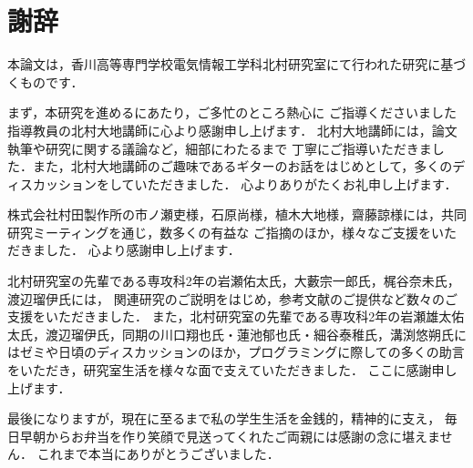 \chapter{謝辞}

本論文は，香川高等専門学校電気情報工学科北村研究室にて行われた研究に基づくものです．

まず，本研究を進めるにあたり，ご多忙のところ熱心に
ご指導くださいました指導教員の北村大地講師に心より感謝申し上げます．
北村大地講師には，論文執筆や研究に関する議論など，細部にわたるまで
丁寧にご指導いただきました．また，北村大地講師のご趣味であるギターのお話をはじめとして，多くのディスカッションをしていただきました．
心よりありがたくお礼申し上げます．

株式会社村田製作所の市ノ瀬吏様，石原尚様，植木大地様，齋藤諒様には，共同研究ミーティングを通じ，数多くの有益な
ご指摘のほか，様々なご支援をいただきました．
心より感謝申し上げます．

北村研究室の先輩である専攻科2年の岩瀬佑太氏，大藪宗一郎氏，梶谷奈未氏，渡辺瑠伊氏には，
関連研究のご説明をはじめ，参考文献のご提供など数々のご支援をいただきました．
また，北村研究室の先輩である専攻科2年の岩瀬雄太佑太氏，渡辺瑠伊氏，同期の川口翔也氏・蓮池郁也氏・細谷泰稚氏，溝渕悠朔氏にはゼミや日頃のディスカッションのほか，プログラミングに際しての多くの助言をいただき，研究室生活を様々な面で支えていただきました．
ここに感謝申し上げます．

最後になりますが，現在に至るまで私の学生生活を金銭的，精神的に支え，
毎日早朝からお弁当を作り笑顔で見送ってくれたご両親には感謝の念に堪えません．
これまで本当にありがとうございました．
